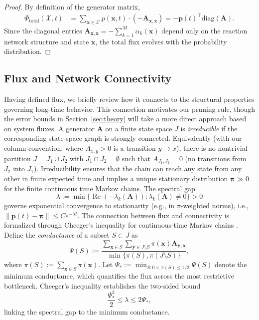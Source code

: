 \documentclass[onefignum,onetabnum]{siamart171218}
\begin{document}
\begin{proof}
By definition of the generator matrix,
\begin{align}
\Phi_{\mathrm{total}}(\mathcal{X},t) &= \sum_{\boldsymbol{x} \in \mathcal{X}} p(\boldsymbol{x},t) \cdot (-\mathbf{A}_{\boldsymbol{x},\boldsymbol{x}}) = -\boldsymbol{p}(t)^\top \mathrm{diag}(\mathbf{A}).
\end{align}
Since the diagonal entries $\mathbf{A}_{\boldsymbol{x},\boldsymbol{x}} = -\sum_{k=1}^M \alpha_k(\boldsymbol{x})$ depend only on the reaction network structure and state $\boldsymbol{x}$, the total flux evolves with the probability distribution. 
\end{proof}


\subsection{Flux and Network Connectivity}
\label{sec:flux-connectivity}

Having defined flux, we briefly review how it connects to the structural properties governing long-time behavior. This connection motivates our pruning rule, though the error bounds in Section~\ref{sec:theory} will take a more direct approach based on system fluxes. A generator $\mathbf{A}$ on a finite state space $J$ is \textit{irreducible} if the corresponding state-space graph is strongly connected. Equivalently (with our column convention, where $A_{x,y}>0$ is a transition $y\!\to\!x$), there is no nontrivial partition $J=J_1\cup J_2$ with $J_1\cap J_2=\emptyset$ such that $A_{J_1,J_2}=0$ (no transitions from $J_2$ into $J_1$). Irreducibility ensures that the chain can reach any state from any other in finite expected time and implies a unique stationary distribution $\boldsymbol{\pi}\gg 0$ for the finite continuous time Markov chains. The spectral gap
\[
\lambda := \min\{\operatorname{Re}(-\lambda_k(\mathbf{A})):\lambda_k(\mathbf{A})\neq 0\} > 0
\]
governs exponential convergence to stationarity (e.g., in $\pi$-weighted norms), i.e., $\|\boldsymbol{p}(t)-\boldsymbol{\pi}\|\le C e^{-\lambda t}$. The connection between flux and connectivity is formalized through Cheeger's inequality for continuous-time Markov chains \cite{Diaconis1991,63529}. Define the \textit{conductance} of a subset $S \subset J$ as
\begin{equation}
\Psi(S) := \frac{\sum_{\boldsymbol{x} \in S}\sum_{\boldsymbol{y} \in J \setminus S} \pi(\boldsymbol{x}) \mathbf{A}_{\boldsymbol{y},\boldsymbol{x}}}{\min\{\pi(S), \pi(J\setminus S)\}},
\label{eq:cheeger}
\end{equation}
where $\pi(S) := \sum_{\boldsymbol{x} \in S} \pi(\boldsymbol{x})$. Let $\Psi_* := \min_{S: 0 < \pi(S) \leq 1/2} \Psi(S)$ denote the minimum conductance, which quantifies the flux across the most restrictive bottleneck. Cheeger's inequality establishes the two-sided bound
\begin{equation}
\label{eq:cheeger1}
\frac{\Psi_*^2}{2} \leq \lambda \leq 2\Psi_*,
\end{equation}
linking the spectral gap to the minimum conductance.
\end{document}
